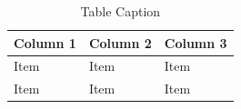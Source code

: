 
\begin{table}[H]

\centering

\caption{Table Caption}

\label{tab:example}

\begin{tabular}{lll}

\toprule

Column 1 &
Column 2 &
Column 3 \\

\midrule

Item &
Item &
Item \\

Item &
Item &
Item \\

\bottomrule

\end{tabular}

\end{table}